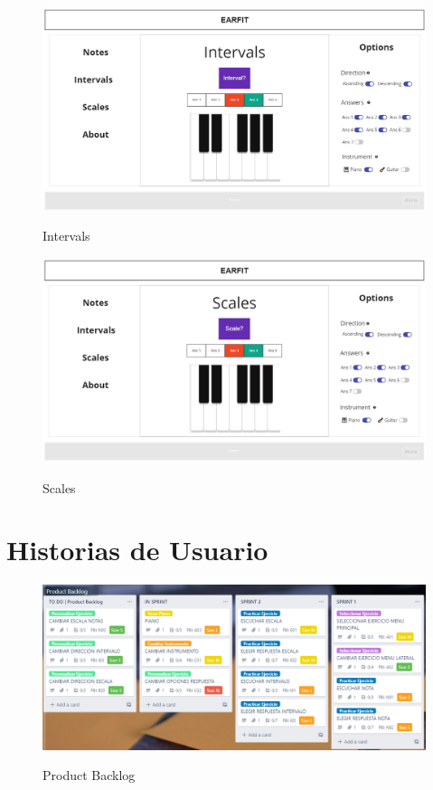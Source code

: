 \documentclass[12pt,twoside,titlepage]{report}
\begin{document}
\begin{figure}[H]
    \centering
    \includegraphics[scale=0.29]{Design Thinking/Prototipo/Large/Intervals}
    \label{fig:IntervalsLarge}
    \caption{Intervals}
\end{figure}

\begin{figure}[H]
    \centering
    \includegraphics[scale=0.3]{Design Thinking/Prototipo/Large/Scales}
    \label{fig:ScalesLarge}
    \caption{Scales}
\end{figure}


\chapter{Historias de Usuario}

\begin{figure}[H]
    \centering
    \includegraphics[scale=0.73]{Scrum/User Stories/ProductBacklog}
    \label{fig:ProductBacklog}
    \caption{Product Backlog}
\end{figure}
\end{document}
